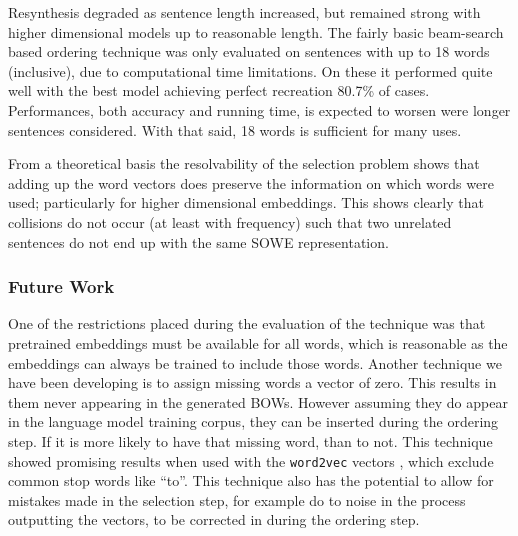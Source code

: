 \documentclass[11pt]{article}
\theoremstyle{plain}
\theoremstyle{definition}
\begin{document}
Resynthesis degraded as sentence length increased, but remained strong with higher dimensional models up to reasonable length. The fairly basic beam-search based ordering technique was only evaluated on sentences with up to 18 words (inclusive), due to computational time limitations. On these it performed quite well with the best model achieving perfect recreation 80.7\% of cases. Performances, both accuracy and running time, is expected to worsen were longer sentences considered. With that said, 18 words is sufficient for many uses.

From a theoretical basis the resolvability of the selection problem shows that adding up the word vectors does preserve the information on which words were used; particularly for higher dimensional embeddings. This shows clearly that collisions do not occur (at least with frequency) such that two unrelated sentences do not end up with the same SOWE representation. 

\subsubsection{Future Work}\label{future}
One of the restrictions placed during the evaluation of the technique was that pretrained embeddings must be available for all words, which is reasonable as the embeddings can always be trained to include those words. Another technique we have been developing is to assign missing words a vector of zero. This results in them never appearing in the generated BOWs. However assuming they do appear in the language model training corpus, they can be inserted during the ordering step. If it is more likely to have that missing word, than to not. This technique showed promising results when used with the \texttt{word2vec} vectors \parencite{mikolovSkip}, which exclude common stop words like ``to''. This technique also has the potential to allow for mistakes made in the selection step, for example do to noise in the process outputting the vectors, to be corrected in during the ordering step.




\printbibliography
	
\end{document}
